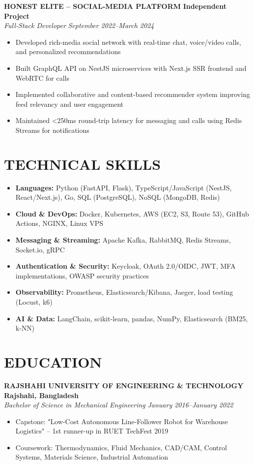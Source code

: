 \documentclass[11pt,letterpaper]{article}
\newcommand{\role}[4]{
  \begin{center}
  \textbf{#1} \hfill \textbf{#2} \\
  \textit{#3} \hfill \textit{#4}
  \end{center}
}
\begin{document}
\role{HONEST ELITE -- SOCIAL-MEDIA PLATFORM}{Independent Project}{Full-Stack Developer}{September 2022--March 2024}
\begin{itemize}[leftmargin=*,nosep,topsep=0pt]
  \item Developed rich-media social network with real-time chat, voice/video calls, and personalized recommendations
  \item Built GraphQL API on NestJS microservices with Next.js SSR frontend and WebRTC for calls
  \item Implemented collaborative and content-based recommender system improving feed relevancy and user engagement
  \item Maintained <250ms round-trip latency for messaging and calls using Redis Streams for notifications
\end{itemize}

\vspace{1em}
\section{TECHNICAL SKILLS}

\vspace{0.5em}
\begin{itemize}[leftmargin=*,nosep]
  \item \textbf{Languages:} Python (FastAPI, Flask), TypeScript/JavaScript (NestJS, React/Next.js), Go, SQL (PostgreSQL), NoSQL (MongoDB, Redis)
  \item \textbf{Cloud \& DevOps:} Docker, Kubernetes, AWS (EC2, S3, Route 53), GitHub Actions, NGINX, Linux VPS
  \item \textbf{Messaging \& Streaming:} Apache Kafka, RabbitMQ, Redis Streams, Socket.io, gRPC
  \item \textbf{Authentication \& Security:} Keycloak, OAuth 2.0/OIDC, JWT, MFA implementations, OWASP security practices
  \item \textbf{Observability:} Prometheus, Elasticsearch/Kibana, Jaeger, load testing (Locust, k6)
  \item \textbf{AI \& Data:} LangChain, scikit-learn, pandas, NumPy, Elasticsearch (BM25, k-NN)
\end{itemize}

\vspace{1em}
\section{EDUCATION}

\vspace{0.5em}
\role{RAJSHAHI UNIVERSITY OF ENGINEERING \& TECHNOLOGY}{Rajshahi, Bangladesh}{Bachelor of Science in Mechanical Engineering}{January 2016--January 2022}
\begin{itemize}[leftmargin=*,nosep,topsep=0pt]
  \item Capstone: "Low-Cost Autonomous Line-Follower Robot for Warehouse Logistics" -- 1st runner-up in RUET TechFest 2019
  \item Coursework: Thermodynamics, Fluid Mechanics, CAD/CAM, Control Systems, Materials Science, Industrial Automation
\end{itemize}
\end{document}

